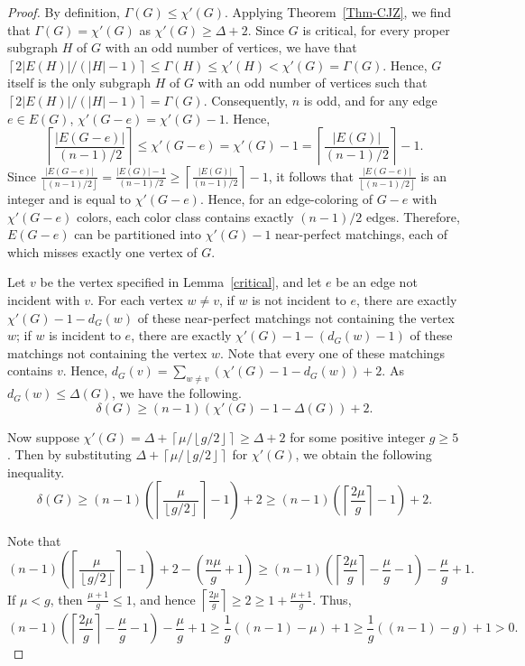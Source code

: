 \documentclass[12pt,oneside]{amsart}
\newcommand\roundup[1]{\left\lceil#1\right\rceil}
\newcommand\rounddown[1]{\left\lfloor#1\right\rfloor}
\begin{document}
\begin{proof} By definition, $\Gamma(G) \le \chi'(G)$. Applying  Theorem~\ref{Thm-CJZ}, we find that $\Gamma(G)=\chi'(G)$ as $\chi'(G) \ge \Delta +2$. Since $G$ is critical, for every proper subgraph $H$ of $G$ with an odd number of vertices, we have that $\roundup{2|E(H)|/(|H|-1)} \le \Gamma(H) \le \chi'(H) < \chi'(G) = \Gamma(G)$.  Hence, $G$ itself is the only subgraph $H$ of $G$ with an odd number of vertices such that $\roundup{2|E(H)|/(|H|-1)} = \Gamma(G)$. Consequently, $n$ is odd, and for any edge $e\in E(G)$,
\( \chi'(G-e) =\chi'(G) -1\). Hence,
\[
 \roundup{\frac{|E(G-e)|}{(n-1)/2}} \le \chi'(G-e)= \chi'(G) -1 = \roundup{\frac{|E(G)|}{(n-1)/2}} -1.
\]
Since $\frac{|E(G-e)|}{\rounddown{(n-1)/2}} = \frac{|E(G)|-1}{(n-1)/2} \ge \roundup{\frac{|E(G)|}{(n-1)/2}} -1$, it follows that  $\frac{|E(G-e)|}{\rounddown{(n-1)/2}}$ is an integer and is equal to $\chi'(G-e)$. Hence, for an edge-coloring of $G-e$ with $\chi'(G-e)$ colors, each color class contains exactly $(n-1)/2$ edges. Therefore, \(E(G - e)\) can be partitioned into \(\chi'(G) - 1\) near-perfect matchings, each of which misses exactly one vertex of \(G\).

Let $v$ be the  vertex specified in Lemma~\ref{critical}, and  let $e$ be an edge not incident with $v$.  For each vertex $w\ne v$, if $w$ is not incident to $e$, there are exactly $\chi'(G) -1 -d_G(w)$ of these near-perfect matchings not containing the vertex $w$;  if $w$ is incident to $e$, there are exactly $\chi'(G) -1 -(d_G(w) -1)$ of these matchings  not containing the vertex $w$. Note that every one of these matchings contains $v$. Hence, $d_G(v)  = \sum_{w\ne v} (\chi'(G) -1 -d_G(w)) +2$. As $d_G(w) \le \Delta(G)$, we have the following.
\[
\delta(G) \ge (n-1)(\chi'(G) -1 -\Delta(G)) +2.
\]

Now suppose $\chi'(G)=\Delta + \roundup{\mu/\rounddown{g/2}}\geq \Delta + 2$ for some positive integer $g\geq 5$. Then by substituting $\Delta + \roundup{\mu/\rounddown{g/2}}$ for $\chi'(G)$, we obtain the following inequality.
\[
\delta(G) \ge (n-1)\left(\roundup{\frac{\mu}{\rounddown{g/2}}}-1\right) +2\ge (n-1)\left(\roundup{{\frac{2\mu}g}}-1\right) +2.
\]

Note that
\[
(n-1)\left(\roundup{\frac{\mu}{\rounddown{g/2}}}-1\right) +2 -  \left(\frac {n\mu}g +1\right)
\ge (n-1)\left(\roundup{\frac{2\mu}g}-\frac {\mu}g -1\right) -\frac {\mu}g +1.
\]
If $\mu <   g$, then $\frac {\mu +1}g \le 1$, and hence
$\roundup{\frac{2\mu}g} \ge 2 \ge 1+ \frac {\mu +1}g$. Thus,
\[
(n-1)\left(\roundup{\frac{2\mu}g}-\frac {\mu}g -1\right) -\frac {\mu}g +1 \ge \frac 1g ((n-1) -\mu) +1 \ge \frac 1g((n-1) -g) +1> 0.
\]


\end{proof}
\end{document}
